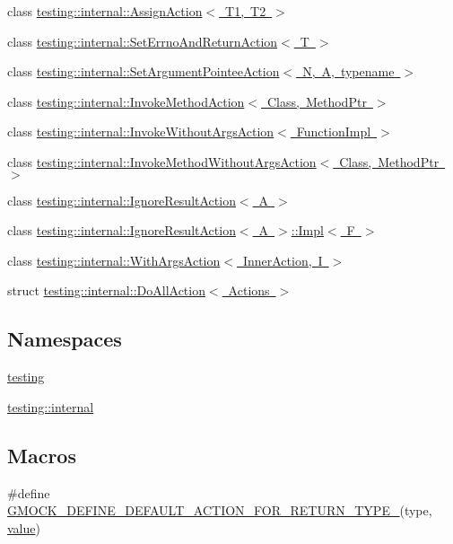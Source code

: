 \begin{DoxyCompactItemize}
\item 
class \mbox{\hyperlink{classtesting_1_1internal_1_1_assign_action}{testing\+::internal\+::\+Assign\+Action$<$ T1, T2 $>$}}
\item 
class \mbox{\hyperlink{classtesting_1_1internal_1_1_set_errno_and_return_action}{testing\+::internal\+::\+Set\+Errno\+And\+Return\+Action$<$ T $>$}}
\item 
class \mbox{\hyperlink{structtesting_1_1internal_1_1_set_argument_pointee_action}{testing\+::internal\+::\+Set\+Argument\+Pointee\+Action$<$ N, A, typename $>$}}
\item 
class \mbox{\hyperlink{structtesting_1_1internal_1_1_invoke_method_action}{testing\+::internal\+::\+Invoke\+Method\+Action$<$ Class, Method\+Ptr $>$}}
\item 
class \mbox{\hyperlink{structtesting_1_1internal_1_1_invoke_without_args_action}{testing\+::internal\+::\+Invoke\+Without\+Args\+Action$<$ Function\+Impl $>$}}
\item 
class \mbox{\hyperlink{structtesting_1_1internal_1_1_invoke_method_without_args_action}{testing\+::internal\+::\+Invoke\+Method\+Without\+Args\+Action$<$ Class, Method\+Ptr $>$}}
\item 
class \mbox{\hyperlink{classtesting_1_1internal_1_1_ignore_result_action}{testing\+::internal\+::\+Ignore\+Result\+Action$<$ A $>$}}
\item 
class \mbox{\hyperlink{classtesting_1_1internal_1_1_ignore_result_action_1_1_impl}{testing\+::internal\+::\+Ignore\+Result\+Action$<$ A $>$\+::\+Impl$<$ F $>$}}
\item 
class \mbox{\hyperlink{structtesting_1_1internal_1_1_with_args_action}{testing\+::internal\+::\+With\+Args\+Action$<$ Inner\+Action, I $>$}}
\item 
struct \mbox{\hyperlink{structtesting_1_1internal_1_1_do_all_action}{testing\+::internal\+::\+Do\+All\+Action$<$ Actions $>$}}
\end{DoxyCompactItemize}
\subsection*{Namespaces}
\begin{DoxyCompactItemize}
\item 
 \mbox{\hyperlink{namespacetesting}{testing}}
\item 
 \mbox{\hyperlink{namespacetesting_1_1internal}{testing\+::internal}}
\end{DoxyCompactItemize}
\subsection*{Macros}
\begin{DoxyCompactItemize}
\item 
\#define \mbox{\hyperlink{_obj__test_2lib_2googletest-master_2googlemock_2include_2gmock_2gmock-actions_8h_a06b1e6cd1145acf7849e4a112976016b}{G\+M\+O\+C\+K\+\_\+\+D\+E\+F\+I\+N\+E\+\_\+\+D\+E\+F\+A\+U\+L\+T\+\_\+\+A\+C\+T\+I\+O\+N\+\_\+\+F\+O\+R\+\_\+\+R\+E\+T\+U\+R\+N\+\_\+\+T\+Y\+P\+E\+\_\+}}(type,  \mbox{\hyperlink{_obj__test_2lib_2googletest-master_2googlemock_2test_2gmock-matchers__test_8cc_a337b8a670efc0b086ad3af163f3121b6}{value}})
\end{DoxyCompactItemize}
